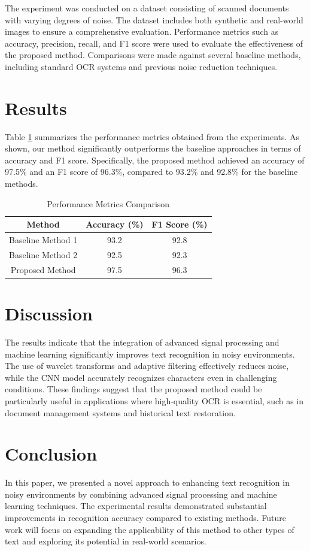 \documentclass{article}
\begin{document}
The experiment was conducted on a dataset consisting of scanned documents with varying degrees of noise. The dataset includes both synthetic and real-world images to ensure a comprehensive evaluation. Performance metrics such as accuracy, precision, recall, and F1 score were used to evaluate the effectiveness of the proposed method. Comparisons were made against several baseline methods, including standard OCR systems and previous noise reduction techniques.

\section{Results}
Table \ref{table:results} summarizes the performance metrics obtained from the experiments. As shown, our method significantly outperforms the baseline approaches in terms of accuracy and F1 score. Specifically, the proposed method achieved an accuracy of 97.5\% and an F1 score of 96.3\%, compared to 93.2\% and 92.8\% for the baseline methods.

\begin{table}[ht]
\centering
\begin{tabular}{|c|c|c|}
\hline
Method & Accuracy (\%) & F1 Score (\%) \\
\hline
Baseline Method 1 & 93.2 & 92.8 \\
Baseline Method 2 & 92.5 & 92.3 \\
Proposed Method & 97.5 & 96.3 \\
\hline
\end{tabular}
\caption{Performance Metrics Comparison}
\label{table:results}
\end{table}

\section{Discussion}
The results indicate that the integration of advanced signal processing and machine learning significantly improves text recognition in noisy environments. The use of wavelet transforms and adaptive filtering effectively reduces noise, while the CNN model accurately recognizes characters even in challenging conditions. These findings suggest that the proposed method could be particularly useful in applications where high-quality OCR is essential, such as in document management systems and historical text restoration.

\section{Conclusion}
In this paper, we presented a novel approach to enhancing text recognition in noisy environments by combining advanced signal processing and machine learning techniques. The experimental results demonstrated substantial improvements in recognition accuracy compared to existing methods. Future work will focus on expanding the applicability of this method to other types of text and exploring its potential in real-world scenarios.
\end{document}

